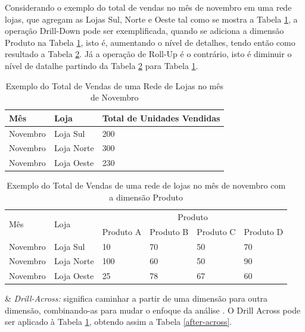 Considerando o exemplo do total de vendas no mês de novembro em uma rede lojas, que agregam as Lojas Sul, Norte e Oeste tal como se mostra a Tabela \ref{before}, a operação Drill-Down pode ser exemplificada, quando se adiciona a dimensão Produto na Tabela \ref{before}, isto é, aumentando o nível de detalhes, tendo então como resultado a Tabela \ref{after}. Já a operação de Roll-Up é o contrário, isto é diminuir o nível de datalhe partindo da Tabela 
\ref{after} para Tabela \ref{before}.

\begin{table}[!ht]
\centering
\begin{tabular}{|l|l|l|}
\hline
Mês & Loja & Total de Unidades Vendidas \\ \hline
Novembro & Loja Sul & 200                        \\ \hline
Novembro & Loja Norte & 300                        \\ \hline
Novembro & Loja Oeste & 230                        \\ \hline
\end{tabular}
\caption{Exemplo do Total de Vendas de uma Rede de Lojas no mês de Novembro}
\label{before}
\end{table}
\FloatBarrier


\begin{table}[!ht]
\centering
\begin{tabular}{|l|l|l|l|l|l|}
\hline
\multirow{2}{*}{Mês} & \multirow{2}{*}{Loja} & \multicolumn{4}{c|}{Produto}                 \\ \cline{3-6} 
                     &                       & Produto A & Produto B & Produto C & Produto D \\ \hline
Novembro             & Loja Sul              & 10        & 70        & 50        & 70        \\ \hline
Novembro             & Loja Norte            & 100       & 60        & 50        & 90        \\ \hline
Novembro             & Loja Oeste            & 25        & 78        & 67        & 60        \\ \hline
\end{tabular}
\caption{Exemplo do Total de Vendas de uma rede de lojas no mês de novembro com a dimensão Produto}
\label{after}
\end{table}

\begin{easylist}[itemize]

& \textit{Drill-Across:} significa caminhar a partir de uma dimensão para
outra dimensão, combinando-as para mudar o enfoque da
análise \cite{andre2000}. O Drill Across pode ser aplicado à Tabela \ref{before}, obtendo assim a Tabela \ref{after-across}.
\end{easylist}

